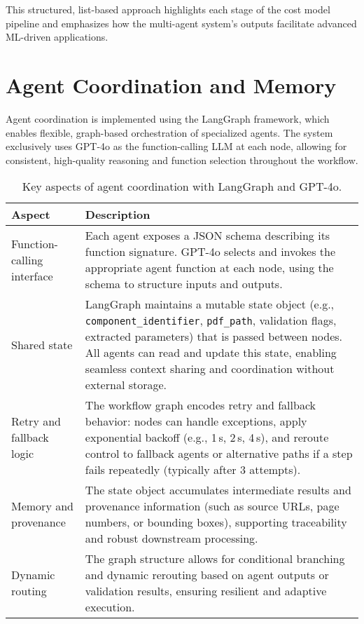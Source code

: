This structured, list-based approach highlights each stage of the cost model pipeline and emphasizes how the multi-agent system's outputs facilitate advanced ML-driven applications.

\section{Agent Coordination and Memory}
Agent coordination is implemented using the LangGraph framework, which enables flexible, graph-based orchestration of specialized agents. The system exclusively uses GPT-4o as the function-calling LLM at each node, allowing for consistent, high-quality reasoning and function selection throughout the workflow.

\begin{table}[H]
  \centering
  \caption{Key aspects of agent coordination with LangGraph and GPT-4o.}
  \begin{tabular}{p{3.5cm} p{10cm}}
    \hline
    \textbf{Aspect} & \textbf{Description} \\
    \hline
    Function-calling interface & Each agent exposes a JSON schema describing its function signature. GPT-4o selects and invokes the appropriate agent function at each node, using the schema to structure inputs and outputs. \\
    Shared state & LangGraph maintains a mutable state object (e.g., \verb|component_identifier|, \verb|pdf_path|, validation flags, extracted parameters) that is passed between nodes. All agents can read and update this state, enabling seamless context sharing and coordination without external storage. \\
    Retry and fallback logic & The workflow graph encodes retry and fallback behavior: nodes can handle exceptions, apply exponential backoff (e.g., 1\,s, 2\,s, 4\,s), and reroute control to fallback agents or alternative paths if a step fails repeatedly (typically after 3 attempts). \\
    Memory and provenance & The state object accumulates intermediate results and provenance information (such as source URLs, page numbers, or bounding boxes), supporting traceability and robust downstream processing. \\
    Dynamic routing & The graph structure allows for conditional branching and dynamic rerouting based on agent outputs or validation results, ensuring resilient and adaptive execution. \\
    \hline
  \end{tabular}
\end{table}

